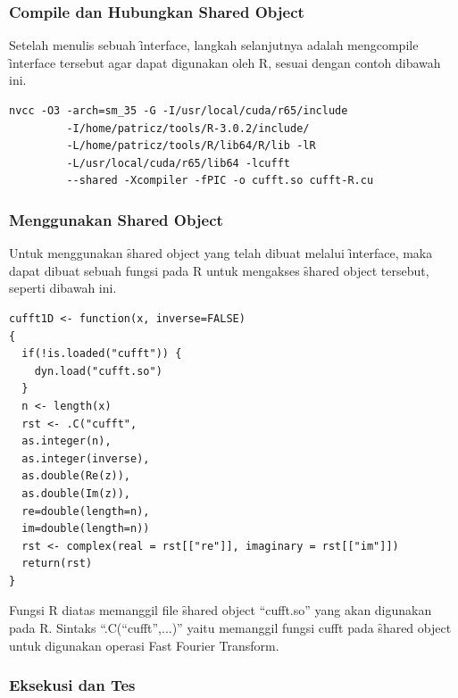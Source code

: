 \subsubsection{Compile dan Hubungkan Shared Object}

Setelah menulis sebuah \f{interface}, langkah selanjutnya adalah mengcompile \f{interface} tersebut agar dapat digunakan oleh R, sesuai dengan contoh dibawah ini.

\begin{lstlisting}
nvcc -O3 -arch=sm_35 -G -I/usr/local/cuda/r65/include 
         -I/home/patricz/tools/R-3.0.2/include/ 
         -L/home/patricz/tools/R/lib64/R/lib -lR 
         -L/usr/local/cuda/r65/lib64 -lcufft 
         --shared -Xcompiler -fPIC -o cufft.so cufft-R.cu
\end{lstlisting}
\subsubsection{Menggunakan Shared Object}

Untuk menggunakan \f{shared object} yang telah dibuat melalui \f{interface}, maka dapat dibuat sebuah fungsi pada R untuk mengakses \f{shared object} tersebut, seperti dibawah ini.

\begin{lstlisting}
cufft1D <- function(x, inverse=FALSE)
{
  if(!is.loaded("cufft")) {
    dyn.load("cufft.so")
  }
  n <- length(x)
  rst <- .C("cufft",
  as.integer(n),
  as.integer(inverse),
  as.double(Re(z)),
  as.double(Im(z)),
  re=double(length=n),
  im=double(length=n))
  rst <- complex(real = rst[["re"]], imaginary = rst[["im"]])
  return(rst)
}
\end{lstlisting}

Fungsi R diatas memanggil file \f{shared object}  “cufft.so” yang akan digunakan pada R. Sintaks “.C(“cufft”,...)” yaitu memanggil fungsi cufft pada \f{shared object} untuk digunakan operasi Fast Fourier Transform.

\subsubsection{Eksekusi dan Tes}

